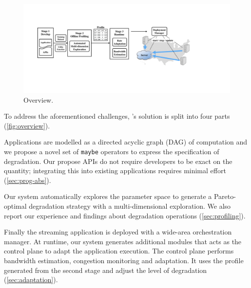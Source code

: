 \begin{figure}
  \centering
  \includegraphics[width=\linewidth]{figures/arch.pdf}
  \caption{\sysname{} Overview.}
  \label{fig:overview}
\end{figure}

To address the aforementioned challenges, \sysname{}'s solution is split into
four parts (\autoref{fig:overview}).

 Applications are modelled as a directed acyclic
graph (DAG) of computation and we propose a novel set of \texttt{maybe}
operators to express the specification of degradation. Our propose APIs do not
require developers to be exact on the quantity; integrating this into existing
applications requires minimal effort (\autoref{sec:prog-abs}).

 Our system automatically explores
the parameter space to generate a Pareto-optimal degradation strategy with a
multi-dimensional exploration. We also report our experience and findings about
degradation operations (\autoref{sec:profiling}).

 Finally the streaming application is deployed with a
wide-area orchestration manager. At runtime, our system generates additional
modules that acts as the control plane to adapt the application execution. The
control plane performs bandwidth estimation, congestion monitoring and
adaptation. It uses the profile generated from the second stage and adjust the
level of degradation (\autoref{sec:adaptation}).

